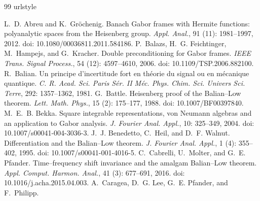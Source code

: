 \documentclass[11pt,reqno]{amsart}
\numberwithin{equation}{section}
\theoremstyle{definition}
\theoremstyle{remark}
\begin{document}

\begin{thebibliography}{99}
\providecommand{\natexlab}[1]{#1}
\providecommand{\url}[1]{\texttt{#1}}
\expandafter\ifx\csname urlstyle\endcsname\relax
  \providecommand{\doi}[1]{doi: #1}\else
  \providecommand{\doi}{doi: \begingroup \urlstyle{rm}\Url}\fi

L.~D. Abreu and K.~Gr\"ochenig.
\newblock Banach {G}abor frames with {H}ermite functions: polyanalytic spaces from the {H}eisenberg group.
\newblock \emph{Appl. Anal.}, 91 (11): 1981--1997, 2012.
\newblock \doi{10.1080/00036811.2011.584186}.
P.~Balazs, H.~G. Feichtinger, M.~Hampejs, and G.~Kracher.
\newblock Double preconditioning for {G}abor frames.
\newblock \emph{IEEE Trans. Signal Process.}, 54 (12): 4597--4610, 2006.
\newblock \doi{10.1109/TSP.2006.882100}.
R.~Balian.
\newblock Un principe d'incertitude fort en th\'eorie du signal ou en
  m\'ecanique quantique.
\newblock \emph{C. R. Acad. Sci. Paris S\'er. II M\'ec. Phys. Chim. Sci.
  Univers Sci. Terre}, 292: 1357--1362, 1981.
G.~Battle.
\newblock Heisenberg proof of the {B}alian--{L}ow theorem.
\newblock \emph{Lett. Math. Phys.}, 15 (2): 175--177, 1988.
\newblock \doi{10.1007/BF00397840}.
M.~E.~B. Bekka.
\newblock Square integrable representations, von {N}eumann algebras and an
  application to {G}abor analysis.
\newblock \emph{J. Fourier Anal. Appl.}, 10: 325--349, 2004.
\newblock \doi{10.1007/s00041-004-3036-3}.
J.~J. Benedetto, C.~Heil, and D.~F. Walnut.
\newblock Differentiation and the {B}alian--{L}ow theorem.
\newblock \emph{J. Fourier Anal. Appl.}, 1 (4): 355--402, 1995.
\newblock \doi{10.1007/s00041-001-4016-5}.
C.~Cabrelli, U.~Molter, and G.~E. Pfander.
\newblock Time--frequency shift invariance and the amalgam {B}alian--{L}ow
  theorem.
\newblock \emph{Appl. Comput. Harmon. Anal.}, 41 (3):
  677--691, 2016.
\newblock \doi{10.1016/j.acha.2015.04.003}.
A.~Caragea, D.~G. Lee, G.~E. Pfander, and F.~Philipp.

\end{thebibliography}
\end{document}
